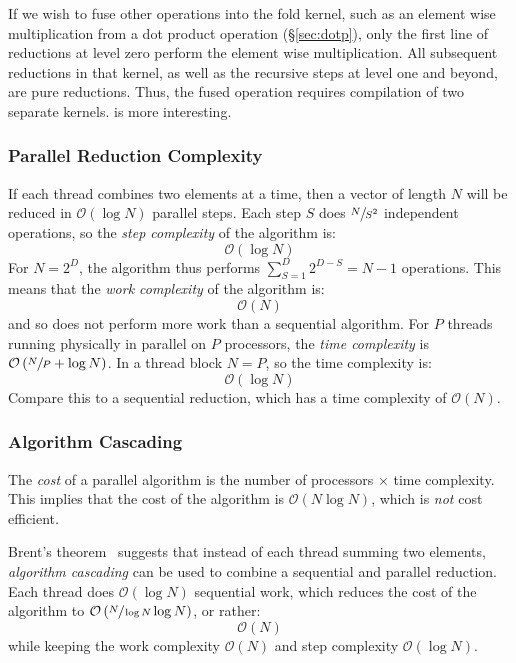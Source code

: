 If we wish to fuse other operations into the fold kernel, such as an element
wise multiplication from a dot product operation (\S\ref{sec:dotp}), only the
first line of reductions at level zero perform the element wise multiplication.
All subsequent reductions in that kernel, as well as the recursive steps at
level one and beyond, are pure reductions. Thus, the fused operation requires
compilation of two separate kernels. %
is more interesting.

\subsubsection{Parallel Reduction Complexity}
\label{sec:parallel_reduction_complexity}

If each thread combines two elements at a time, then a vector of length $N$ will
be reduced in $\mathcal{O}\left( \log N \right)$ parallel steps. Each step $S$
does $\sfrac{N}{S^2}$ independent operations, so the \emph{step
complexity} of the algorithm is:
\[
\mathcal{O}\left( \log N \right)
\]
For $N=2^{D}$, the algorithm thus performs $\sum_{S=1}^{D}2^{D-S} = N - 1$
operations. This means that the \emph{work complexity} of
the algorithm is:
\[
\mathcal{O}\left( N \right)
\]
and so does not perform more work than a sequential algorithm. For $P$ threads
running physically in parallel on $P$ processors, the \emph{time
complexity} is $\mathcal{O}\left( \sfrac{N}{P} + \log N
\right)$. In a thread block $N = P$, so the time complexity is:
\[
\mathcal{O}\left( \log N \right)
\]
Compare this to a sequential reduction, which has a time complexity of
$\mathcal{O}\left( N \right)$.

\subsubsection{Algorithm Cascading}
\label{sec:algorithm_cascading}

The \emph{cost} of a parallel algorithm is the number of processors $\times$
time complexity. This implies that the cost of the algorithm is
$\mathcal{O}\left( N \log N \right)$, which is \emph{not} cost efficient.

Brent's theorem~\cite{Chatterjee:2009vh} suggests that instead of each thread
summing two elements, \emph{algorithm cascading} can be used to combine a
sequential and parallel reduction. Each thread does $\mathcal{O}\left( \log N
\right)$ sequential work, which reduces the cost of the algorithm to
$\mathcal{O}\left( \sfrac{N}{\log N} \log N \right)$, or rather:
\[
\mathcal{O}\left( N \right)
\]
while keeping the work complexity $\mathcal{O}\left( N \right)$ and step
complexity $\mathcal{O}\left( \log N \right)$.

